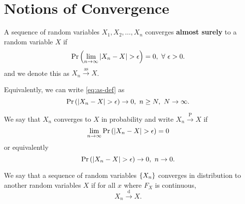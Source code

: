 \documentclass[twoside]{article}
\begin{document}



\section{Notions of Convergence}

\begin{definition}
    A sequence of random variables \(X_1,X_2,\ldots,X_n\) converges
    \textbf{almost surely} to a random variable \(X\) if
    \begin{equation}
        \Pr\left(\lim_{n\to\infty}\left\vert X_n-X\right\vert > \epsilon\right) = 0,\ \forall\ \epsilon > 0.
        \label{eq:as-def}
    \end{equation}
    and we denote this as \(X_n \xrightarrow{\mathrm{as}} X\).

    Equivalently, we can write \eqref{eq:as-def} as
    \begin{equation}
        \Pr\left(\left\vert X_n-X\right\vert > \epsilon\right) \to 0,\ n \ge N,\ N \to \infty.
        \label{eq:as-def-2}
    \end{equation}
\end{definition}

\begin{definition}
    We say that \(X_n\) converges to \(X\) in probability and write \(X_n \xrightarrow{\mathrm{P}}X\) if
    \begin{equation}
        \lim_{n\to\infty}\Pr\left(\left\vert X_n-X\right\vert>\epsilon\right) = 0
        \label{eq:pr-conv-def}
    \end{equation}
    or equivalently
    \begin{equation}
        \Pr\left(\left\vert X_n-X\right\vert>\epsilon\right) \to 0,\ n \to 0.
        \label{eq:pr-conv-def-2}
    \end{equation}
\end{definition}

\begin{definition}
    We say that a sequence of random variables \(\left\{X_n\right\}\) converges in
    distribution to another random variables \(X\) if for all \(x\) where 
    \(F_X\) is continuous,
    \begin{equation}
        X_n \xrightarrow{\mathrm{d}} X.
        \label{eq:dis-conv-def}
    \end{equation}
\end{definition}
\end{document}
